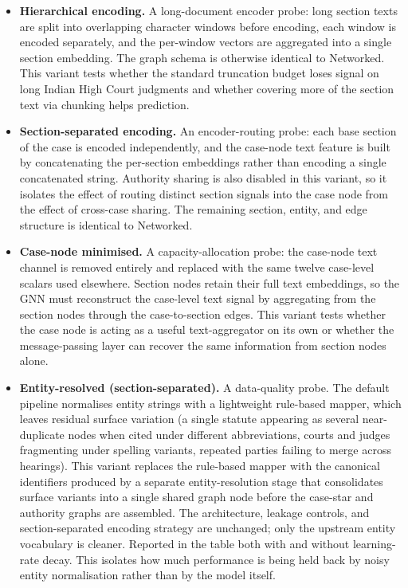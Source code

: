 \documentclass[runningheads]{llncs}
\begin{document}
\begin{itemize}[leftmargin=*]
    \item \textbf{Hierarchical encoding.} A long-document encoder probe: long section texts are split into overlapping character windows before encoding, each window is encoded separately, and the per-window vectors are aggregated into a single section embedding. The graph schema is otherwise identical to Networked. This variant tests whether the standard truncation budget loses signal on long Indian High Court judgments and whether covering more of the section text via chunking helps prediction.

    \item \textbf{Section-separated encoding.} An encoder-routing probe: each base section of the case is encoded independently, and the case-node text feature is built by concatenating the per-section embeddings rather than encoding a single concatenated string. Authority sharing is also disabled in this variant, so it isolates the effect of routing distinct section signals into the case node from the effect of cross-case sharing. The remaining section, entity, and edge structure is identical to Networked.

    \item \textbf{Case-node minimised.} A capacity-allocation probe: the case-node text channel is removed entirely and replaced with the same twelve case-level scalars used elsewhere. Section nodes retain their full text embeddings, so the GNN must reconstruct the case-level text signal by aggregating from the section nodes through the case-to-section edges. This variant tests whether the case node is acting as a useful text-aggregator on its own or whether the message-passing layer can recover the same information from section nodes alone.

    \item \textbf{Entity-resolved (section-separated).} A data-quality probe. The default pipeline normalises entity strings with a lightweight rule-based mapper, which leaves residual surface variation (a single statute appearing as several near-duplicate nodes when cited under different abbreviations, courts and judges fragmenting under spelling variants, repeated parties failing to merge across hearings). This variant replaces the rule-based mapper with the canonical identifiers produced by a separate entity-resolution stage that consolidates surface variants into a single shared graph node before the case-star and authority graphs are assembled. The architecture, leakage controls, and section-separated encoding strategy are unchanged; only the upstream entity vocabulary is cleaner. Reported in the table both with and without learning-rate decay. This isolates how much performance is being held back by noisy entity normalisation rather than by the model itself.


\end{itemize}
\end{document}
